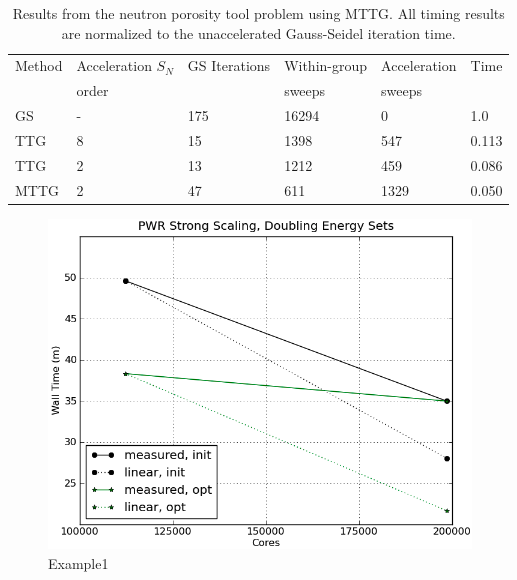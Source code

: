 \documentclass[preprint,12pt]{elsarticle}
\begin{document}
\begin{table}[p]
  \caption{
    Results from the neutron porosity tool problem using MTTG.  All
    timing results are normalized to the unaccelerated Gauss-Seidel
    iteration time.
  }
  \label{tab:MTTG-porosity-tool}
  \begin{center}
    \begin{tabular}{llllll}\hline\hline
      Method & Acceleration $S_N$  & GS Iterations & Within-group
      & Acceleration & Time \\
      & order & & sweeps & sweeps &  \\\hline
      GS   & - & 175 & 16294 & 0    & 1.0   \\
      TTG  & 8 & 15  & 1398  & 547  & 0.113 \\
      TTG  & 2 & 13  & 1212  & 459  & 0.086 \\
      MTTG & 2 & 47  & 611   & 1329 & 0.050 \\
      \hline\hline
    \end{tabular}
  \end{center}
\end{table}


\clearpage

\begin{figure}[p]
  \begin{center}
    \includegraphics[width=6in,clip]{PWRstrongScaling}
  \end{center}
  \caption{Example1}
  \label{fig:example1}
\end{figure}
\end{document}

